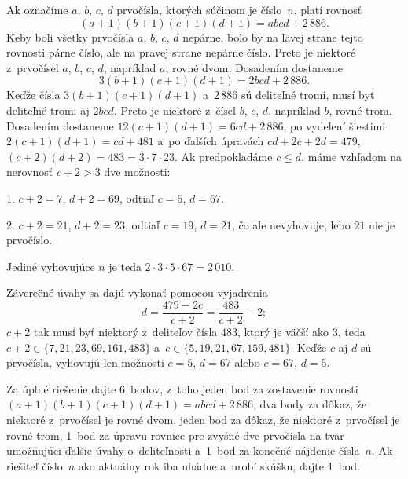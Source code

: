 {%
Ak označíme $a$, $b$, $c$, $d$ prvočísla, ktorých súčinom je číslo~$n$, platí rovnosť
$$
(a+1)(b+1)(c+1)(d+1)=abcd+2\,886.
$$
Keby boli všetky prvočísla $a$, $b$, $c$, $d$ nepárne, bolo by na ľavej strane tejto rovnosti párne číslo, ale na pravej strane nepárne číslo. Preto je niektoré z~prvočísel $a$, $b$, $c$, $d$, napríklad $a$, rovné dvom. Dosadením dostaneme
$$
3(b+1)(c+1)(d+1)=2bcd+2\,886.
$$
Keďže čísla $3(b+1)(c+1)(d+1)$ a~$2\,886$ sú deliteľné tromi, musí byť deliteľné tromi aj $2bcd$. Preto je niektoré z~čísel $b$, $c$, $d$, napríklad $b$, rovné trom. Dosadením dostaneme $12(c+1)(d+1)=6cd+2\,886$, po vydelení šiestimi $2(c+1)(d+1)=cd+481$ a~po ďalších úpravách $cd+2c+2d=479$, $(c+2)(d+2)=483=3\cdot7\cdot23$. Ak predpokladáme $c\le d$, máme vzhľadom na nerovnosť $c+2>3$ dve možnosti:

1. $c+2=7$, $d+2=69$, odtiaľ $c=5$, $d=67$.

2. $c+2=21$, $d+2=23$, odtiaľ $c=19$, $d=21$, čo ale nevyhovuje, lebo $21$ nie je prvočíslo.

Jediné vyhovujúce $n$ je teda $2\cdot3\cdot5\cdot67=2\,010$.

\poznamka
Záverečné úvahy sa dajú vykonať pomocou vyjadrenia
$$
d=\frac{479-2c}{c+2}=\frac{483}{c+2}-2;
$$
$c+2$ tak musí byť niektorý z~deliteľov čísla $483$, ktorý je väčší ako $3$, teda $c+2\in\{7, 21, 23, 69, 161, 483\}$ a~$c\in\{5, 19, 21, 67, 159, 481\}$. Keďže $c$ aj $d$ sú prvočísla, vyhovujú len možnosti $c=5$, $d=67$ alebo $c=67$, $d=5$.

\nobreak\medskip\petit\noindent
Za úplné riešenie dajte 6~bodov, z~toho
jeden bod za zostavenie rovnosti $(a+1)(b+1)(c+1)(d+1)=abcd+2\,886$, dva
body za dôkaz, že niektoré z~prvočísel je rovné dvom, jeden bod za dôkaz, že
niektoré z~prvočísel je rovné trom, 1~bod za úpravu rovnice pre zvyšné dve prvočísla na tvar
umožňujúci ďalšie úvahy o~deliteľnosti a~1~bod za konečné
nájdenie čísla~$n$. Ak riešiteľ číslo~$n$ ako aktuálny rok
iba uhádne a~urobí skúšku, dajte 1~bod.
\endpetit
}


